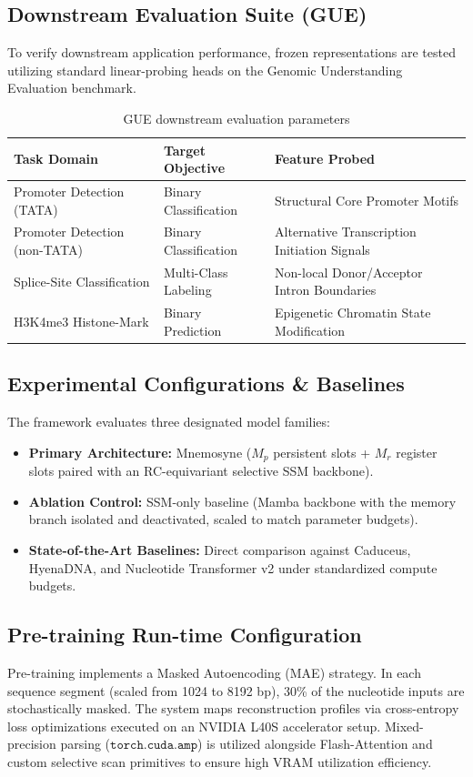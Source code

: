 \documentclass[11pt,a4paper]{article}
\begin{document}
\subsection{Downstream Evaluation Suite (GUE)}
To verify downstream application performance, frozen representations are tested utilizing standard linear-probing heads on the Genomic Understanding Evaluation benchmark.

\begin{table}[h]
\centering
\caption{GUE downstream evaluation parameters}
\label{tab:gue}
\begin{tabular}{@{}lll@{}}
\toprule
Task Domain & Target Objective & Feature Probed \\
\midrule
Promoter Detection (TATA) & Binary Classification & Structural Core Promoter Motifs \\
Promoter Detection (non-TATA) & Binary Classification & Alternative Transcription Initiation Signals \\
Splice-Site Classification & Multi-Class Labeling & Non-local Donor/Acceptor Intron Boundaries \\
H3K4me3 Histone-Mark & Binary Prediction & Epigenetic Chromatin State Modification \\
\bottomrule
\end{tabular}
\end{table}

\subsection{Experimental Configurations \& Baselines}
The framework evaluates three designated model families:
\begin{itemize}[itemsep=4pt]
    \item \textbf{Primary Architecture:} Mnemosyne ($M_p$ persistent slots + $M_r$ register slots paired with an RC-equivariant selective SSM backbone).
    \item \textbf{Ablation Control:} SSM-only baseline (Mamba backbone with the memory branch isolated and deactivated, scaled to match parameter budgets).
    \item \textbf{State-of-the-Art Baselines:} Direct comparison against Caduceus, HyenaDNA, and Nucleotide Transformer v2 under standardized compute budgets.
\end{itemize}

\subsection{Pre-training Run-time Configuration}
Pre-training implements a Masked Autoencoding (MAE) strategy. In each sequence segment (scaled from 1024 to 8192 bp), 30\% of the nucleotide inputs are stochastically masked. The system maps reconstruction profiles via cross-entropy loss optimizations executed on an NVIDIA L40S accelerator setup. Mixed-precision parsing ($\texttt{torch.cuda.amp}$) is utilized alongside Flash-Attention and custom selective scan primitives to ensure high VRAM utilization efficiency.
\end{document}
